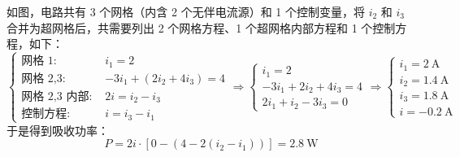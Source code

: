 \documentclass[UTF8]{report}
\theoremstyle{MyLineTheoremStyle} %
\theoremstyle{MyBlockTheoremStyle} %
\theoremstyle{MySubsubsectionStyle} %
\begin{document}
如图，电路共有 3 个网格（内含 2 个无伴电流源）和 1 个控制变量，将 $i_2$ 和 $i_3$ 合并为超网格后，共需要列出 2 个网格方程、1 个超网格内部方程和 1 个控制方程，如下：
\begin{equation}
\begin{cases}
    \text{网格 1: } & i_1 = 2\\ 
    \text{网格 2,3: } & -3i_1 + (2i_2 + 4i_3) = 4\\ 
    \text{网格 2,3 内部: } & 2i = i_2 - i_3\\ 
    \text{控制方程: } & i = i_3 - i_1
\end{cases}\Longrightarrow 
\begin{cases}
    i_1 = 2 \\ 
    -3i_1 + 2i_2 + 4i_3 = 4 \\
    2i_1 + i_2 - 3i_3 = 0
\end{cases}
\Longrightarrow 
\begin{cases}
    i_1 = 2 \ \mathrm{A}\\ 
    i_2 = 1.4 \ \mathrm{A}\\ 
    i_3 = 1.8 \ \mathrm{A} \\ 
    i = -0.2 \ \mathrm{A}
\end{cases}
\end{equation}
于是得到吸收功率：
\begin{equation}
    P = 2i \cdot \left[ 0 - \left(4 - 2(i_2 - i_1)\right) \right] = 2.8 \ \mathrm{W}
\end{equation}
\end{document}
